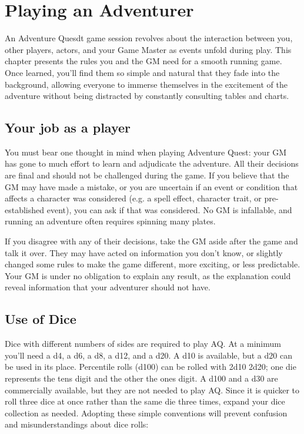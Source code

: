 \chapter{Playing an Adventurer}
\label{ch:play-adventurer}
\setlength{\columnsep}{\defcolwidth}
An Adventure Quesdt game session revolves about the interaction between you, other players, actors, and your Game Master as events unfold during play. This chapter presents the rules you and the GM need for a smooth running game. Once learned, you'll find them so simple and natural that they fade into the background, allowing everyone to immerse themselves in the excitement of the adventure without being distracted by constantly consulting tables and charts.
\section{Your job as a player}
You must bear one thought in mind when playing Adventure Quest: your GM has gone to much effort to learn and adjudicate the adventure. All their decisions are final and
should not be challenged during the game. If you believe that the GM may have made a mistake, or you are uncertain if an event or condition that affects a character was considered (e.g. a spell effect, character trait, or pre-established event), you can ask if that was considered. No GM is infallable, and running an adventure often requires spinning many plates.

If you disagree with any of their decisions, take the GM aside after the game and talk it over. They may have acted on information you don't know, or slightly changed some rules to make the game  different, more exciting, or less predictable. Your GM is under no obligation to explain any result, as the explanation could reveal information that your adventurer should not have.
\section{Use of Dice}


Dice with different numbers of sides are required to play AQ. At a minimum you'll need a d4, a d6, a d8, a d12, and a d20. A d10 is available, but a d20 can be used in its
place. Percentile rolls (d100) can be rolled with 2d10 2d20; one die represents the tens digit and the other the ones digit. A d100 and a d30 are commercially available, but they are not needed to play AQ. Since it is quicker to roll three dice at once rather
than the same die three times, expand your dice collection as needed. Adopting these simple conventions will prevent confusion and misunderstandings about dice rolls:

